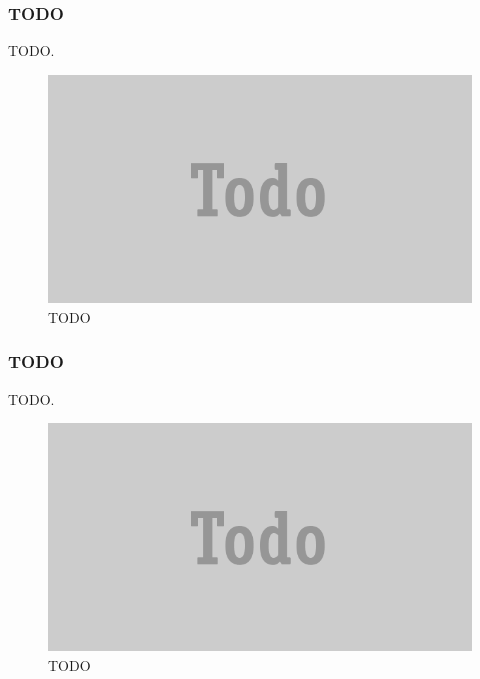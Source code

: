 \documentclass[JCDReport.tex]{subfiles}
\begin{document}
\subsubsection{TODO}
TODO.
\begin{figure}[h!]
	\centering
	\includegraphics[scale=1]{imageslukas/todo.png} 
	\caption{TODO}
\end{figure}






% 
\subsubsection{TODO}
TODO.
\begin{figure}[h!]
	\centering
	\includegraphics[scale=1]{imageslukas/todo.png} 
	\caption{TODO}
\end{figure}

% 
\end{document}
